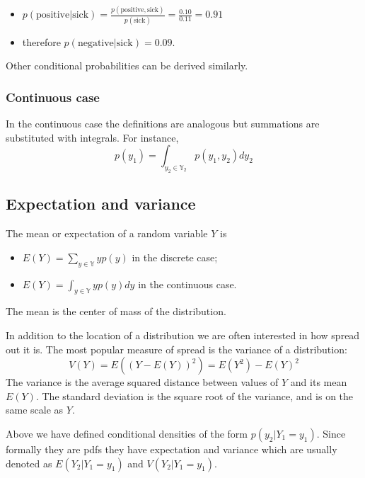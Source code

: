 \documentclass[
]{book}
\begin{document}
\begin{itemize}
\item
  \(p(\text{positive}|\text{sick})= \frac{p(\text{positive},\text{sick})}{p(\text{sick})}=\frac{0.10}{0.11}=0.91\)
\item
  therefore \(p(\text{negative}|\text{sick})=0.09\).
\end{itemize}

Other conditional probabilities can be derived similarly.

\hypertarget{continuous-case}{%
\subsubsection{Continuous case}\label{continuous-case}}

In the continuous case the definitions are analogous but summations are substituted with integrals. For instance,
\[
p(y_1)= \int_{y_2\in\mathbb{Y}_2}p(y_1,y_2)dy_2
\]

\hypertarget{expectation-and-variance}{%
\subsection{Expectation and variance}\label{expectation-and-variance}}

The mean or expectation of a random variable \(Y\) is

\begin{itemize}
\item
  \(E(Y)=\sum_{y\in\mathbb{Y}} y p(y)\) in the discrete case;
\item
  \(E(Y)=\int_{y\in\mathbb{Y}}yp(y)dy\) in the continuous case.
\end{itemize}

The mean is the center of mass of the distribution.

In addition to the location of a distribution we are often interested in how
spread out it is. The most popular measure of spread is the variance of a
distribution:
\[
V(Y)=E((Y-E(Y))^2)= E(Y^2) - E(Y)^2
\]
The variance is the average squared distance between values of \(Y\) and its mean \(E(Y)\). The standard deviation is the square root of the variance, and is on the same scale as \(Y\).

Above we have defined conditional densities of the form \(p(y_2|Y_1=y_1)\). Since formally they are pdfs they have expectation and variance which are usually denoted as \(E(Y_2|Y_1=y_1)\) and \(V(Y_2|Y_1=y_1)\).
\end{document}
